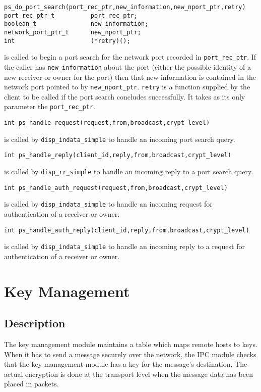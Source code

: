 \begin{verbatim}
ps_do_port_search(port_rec_ptr,new_information,new_nport_ptr,retry)
port_rec_ptr_t          port_rec_ptr;
boolean_t               new_information;
network_port_ptr_t      new_nport_ptr;
int                     (*retry)();
\end{verbatim}
\begin{sloppy}
is called to begin a port search for the network port recorded in
\verb"port_rec_ptr".  If the caller has
\verb"new_"\linebreak[0]\verb"information" about the port (either the
possible identity of a new receiver or owner for the port) then that new
information is contained in the network port pointed to by
\verb"new_nport_ptr".  \verb"retry" is a function supplied by the client to
be called if the port search concludes successfully.  It takes as its only
parameter the \verb"port_rec_ptr".
\end{sloppy}

\begin{verbatim}
int ps_handle_request(request,from,broadcast,crypt_level)
\end{verbatim}
is called by \verb"disp_indata_simple" to handle an incoming port search
query.

\begin{verbatim}
int ps_handle_reply(client_id,reply,from,broadcast,crypt_level)
\end{verbatim}
is called by \verb"disp_rr_simple" to handle an incoming reply to a port
search query.

\begin{verbatim}
int ps_handle_auth_request(request,from,broadcast,crypt_level)
\end{verbatim}
is called by \verb"disp_indata_simple" to handle an incoming request for
authentication of a receiver or owner.

\begin{verbatim}
int ps_handle_auth_reply(client_id,reply,from,broadcast,crypt_level)
\end{verbatim}
is called by \verb"disp_indata_simple" to handle an incoming reply to a
request for authentication of a receiver or owner.

\section{Key Management}
\subsection{Description}
The key management module maintains a table which maps remote hosts to keys.
When it has to send a message securely over the network, the IPC module
checks that the key management module has a key for the message's
destination.  The actual encryption is done at the transport level when the
message data has been placed in packets.

